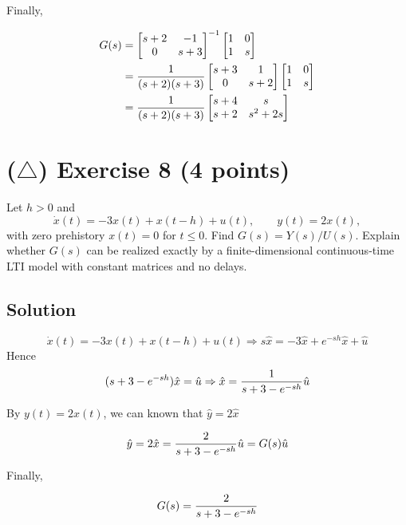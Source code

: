 \documentclass[12pt,a4paper]{article}
\begin{document}
Finally,

\begin{align*}
	G(s) &=  \begin{bmatrix}
		s +2 & -1 \\ 0 & s + 3
	\end{bmatrix}^{-1} \begin{bmatrix}
		1 & 0 \\ 1 & s
	\end{bmatrix} \\
	&= {1\over (s +2) (s + 3)} \begin{bmatrix}
		s +3 & 1 \\ 0 & s + 2
	\end{bmatrix} \begin{bmatrix}
	1 & 0 \\ 1 &s 
	\end{bmatrix} \\
	&= {1\over (s +2 )(s +3)} \begin{bmatrix}
		s + 4 & s \\
		s +2 & s^2 + 2s
\end{bmatrix}
\end{align*}

\vspace{3cm}
\vfill
\clearpage
\section*{($\triangle$) Exercise 8 \hfill {\normalsize (4 points)}}
Let $h>0$ and
\[
\dot x(t)=-3x(t)+x(t-h)+u(t),\qquad y(t)=2x(t),
\]
with zero prehistory $x(t)=0$ for $t\leq0$. Find $G(s)=Y(s)/U(s)$. Explain whether $G(s)$ can be realized exactly by a finite-dimensional continuous-time LTI model with constant matrices and no delays.
\subsection*{Solution}

\[
\dot x(t)=-3x(t)+x(t-h)+u(t) \Rightarrow s\hat x = -3\hat x + e^{-sh} \hat x + \hat u
\]
Hence
\[
(s + 3 - e^{-sh}) \hat x = \hat u \Rightarrow \hat x = {1\over s + 3 - e^{-sh}} \hat u
\]

By $y(t) = 2x(t)$, we can known that $\hat y = 2\hat x$

\[
\hat y = 2 \hat x = {2\over s + 3 - e^{-sh}} \hat u = G(s) \hat u
\]

Finally, 

\[
G(s) = {2\over s + 3 - e^{-sh}}
\]
\end{document}
